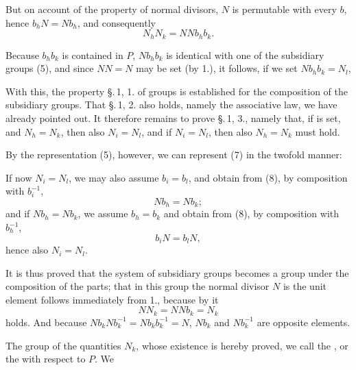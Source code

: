 

But on account of the property of normal divisors, $N$ is permutable with every $b$, hence $b_h N = N b_h$, and consequently
\[
N_h N_k = N N b_h b_k.
\]

Because $b_h b_k$ is contained in $P$, $N b_h b_k$ is identical with one of the subsidiary groups (5), and since $NN = N$ may be set (by 1.), it follows, if we set $N b_h b_k = N_l$,

With this, the property \S.\,1, 1. of groups is established for the composition of the subsidiary groups. That \S.\,1, 2. also holds, namely the associative law, we have already pointed out. It therefore remains to prove \S.\,1, 3., namely that, if
is set, and $N_h = N_k$, then also $N_i = N_l$, and if $N_i = N_l$, then also $N_h = N_k$ must hold.

By the representation (5), however, we can represent (7) in the twofold manner:

If now $N_i = N_l$, we may also assume $b_i = b_l$, and obtain from (8), by composition with $b_i^{-1}$,
\[
N b_h = N b_k;
\]
and if $N b_h = N b_k$, we assume $b_h = b_k$ and obtain from (8), by composition with $b_h^{-1}$,
\[
b_i N = b_l N,
\]
hence also $N_i = N_l$.

It is thus proved that the system of subsidiary groups becomes a group under the composition of the parts; that in this group the normal divisor $N$ is the unit element follows immediately from 1., because by it
\[
N N_k = N N b_k = N_k
\]
holds. And because $N b_k N b_k^{-1} = N b_k b_k^{-1} = N$, $N b_k$ and $N b_k^{-1}$ are opposite elements.

The group of the quantities $N_k$, whose existence is hereby proved, we call the , or the  with respect to $P$. We
